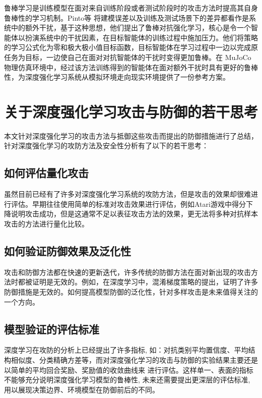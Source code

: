\documentclass[lettersize,journal]{IEEEtran}
\begin{document}
\quad 鲁棒学习是训练模型在面对来自训练阶段或者测试阶段时的攻击方法时提高其自身鲁棒性的学习机制。Pinto等\cite{pinto2017robust} 将建模误差以及训练及测试场景下的差异都看作是系统中的额外干扰，基于这种思想，他们提出了鲁棒对抗强化学习，核心是令一个智能体以扮演系统中的干扰因素，在目标智能体的训练过程中施加压力。他们将策略的学习公式化为零和极大极小值目标函数，目标智能体在学习过程中一边以完成原任务为目标，一边使自己在面对对抗智能体的干扰时变得更加鲁棒。在 MuJoCo 物理仿真环境中，经过该方法训练得到的智能体在面对额外干扰时具有更好的鲁棒性，为深度强化学习系统从模拟环境走向现实环境提供了一份参考方案。





\section{关于深度强化学习攻击与防御的若干思考}

本文针对深度强化学习的攻击方法与抵御这些攻击而提出的防御措施进行了总结，针对深度强化学习的攻防方法及安全性分析有了以下的若干思考：

\subsection{如何评估量化攻击}
虽然目前已经有了许多对深度强化学习系统的攻防方法，但是攻击的效果却很难进行评估。早期往往使用简单的标准对攻击效果进行评估，例如Atari游戏中得分下降说明攻击成功，但是这通常不足以表征攻击方法的效果，更无法将多种对抗样本攻击的方法进行量化比较。

\subsection{如何验证防御效果及泛化性}
\quad 攻击和防御方法都在快速的更新迭代，许多传统的防御方法在面对新出现的攻击方法时都被证明是无效的。例如，在深度学习中，混淆梯度策略的提出，证明了许多防御措施是无效的。如何提高模型防御的泛化性，针对多样攻击是未来值得关注的一个方向。


\subsection{模型验证的评估标准}
深度学习在攻防的分析上已经提出了许多指标, 如：对抗类别平均置信度、平均结构相似度、分类精确方差等，而对深度强化学习的攻击与防御的实验结果主要还是以简单的平均回合奖励、奖励值的收敛曲线来 进行评估。这样单一、表面的指标不能够充分说明深度强化学习模型的鲁棒性, 未来还需要提出更深层的评估标准, 用以展现决策边界、环境模型在防御前后的不同。
\end{document}
